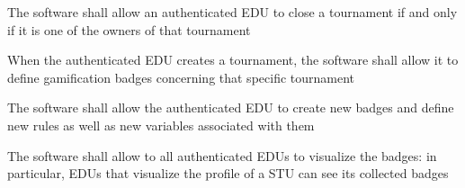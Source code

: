 \begin{requirementsenumerate}
    \item The software shall allow an authenticated EDU to close a tournament if and only if it is one of the owners of that tournament
    \item When the authenticated EDU creates a tournament, the software shall allow it to define gamification badges concerning that specific tournament
    \item The software shall allow the authenticated EDU to create new badges and define new rules as well as new variables associated with them
    \item The software shall allow to all authenticated EDUs to visualize the badges: in particular, EDUs that visualize the profile of a STU can see its collected badges
\end{requirementsenumerate}


